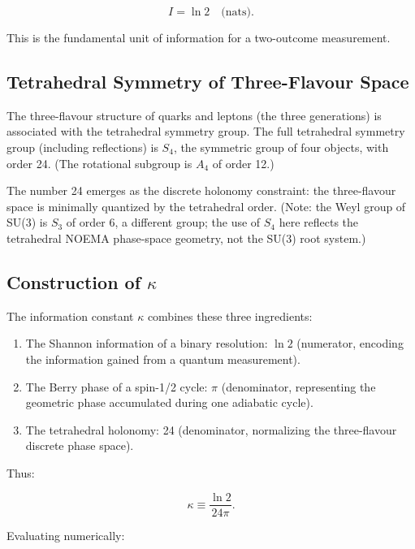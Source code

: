 \begin{equation}
I = \ln 2 \quad \text{(nats)}.
\label{eq:shannon_binary}
\end{equation}

This is the fundamental unit of information for a two-outcome measurement.

\subsection{Tetrahedral Symmetry of Three-Flavour Space}

The three-flavour structure of quarks and leptons (the three generations)
is associated with the tetrahedral symmetry group.  The full tetrahedral
symmetry group (including reflections) is \(S_4\), the symmetric group of
four objects, with order 24.  (The rotational subgroup is \(A_4\) of order
12.)

The number 24 emerges as the discrete holonomy constraint: the three-flavour
space is minimally quantized by the tetrahedral order.  (Note: the Weyl group
of SU(3) is \(S_3\) of order 6, a different group; the use of \(S_4\) here
reflects the tetrahedral NOEMA phase-space geometry, not the SU(3) root
system.)

\subsection{Construction of \(\kappa\)}

The information constant \(\kappa\) combines these three ingredients:

\begin{enumerate}
\item The Shannon information of a binary resolution: \(\ln 2\) (numerator,
encoding the information gained from a quantum measurement).
\item The Berry phase of a spin-1/2 cycle: \(\pi\) (denominator, representing
the geometric phase accumulated during one adiabatic cycle).
\item The tetrahedral holonomy: 24 (denominator, normalizing the three-flavour
discrete phase space).
\end{enumerate}

Thus:

\begin{equation}
\kappa \equiv \frac{\ln 2}{24\pi}.
\label{eq:kappa_construction}
\end{equation}

\noindent Evaluating numerically:

